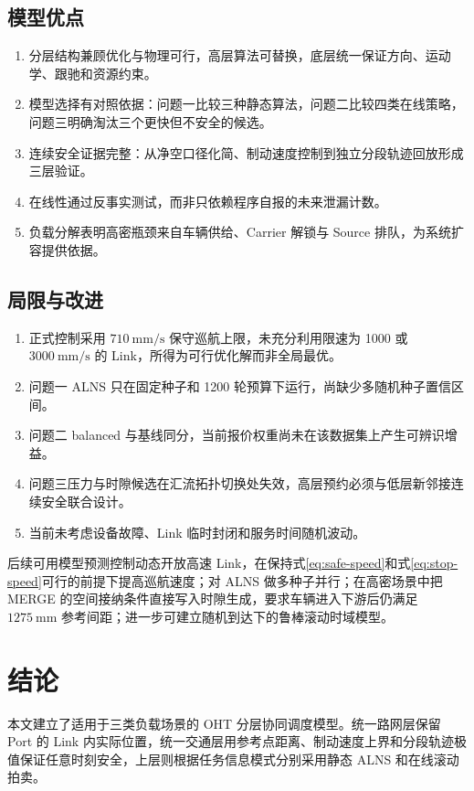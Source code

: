 \documentclass[UTF8]{ctexart}
\begin{document}
\subsection{模型优点}
\begin{enumerate}
\item 分层结构兼顾优化与物理可行，高层算法可替换，底层统一保证方向、运动学、跟驰和资源约束。
\item 模型选择有对照依据：问题一比较三种静态算法，问题二比较四类在线策略，问题三明确淘汰三个更快但不安全的候选。
\item 连续安全证据完整：从净空口径化简、制动速度控制到独立分段轨迹回放形成三层验证。
\item 在线性通过反事实测试，而非只依赖程序自报的未来泄漏计数。
\item 负载分解表明高密瓶颈来自车辆供给、Carrier 解锁与 Source 排队，为系统扩容提供依据。
\end{enumerate}

\subsection{局限与改进}
\begin{enumerate}
\item 正式控制采用 $710\ \mathrm{mm/s}$ 保守巡航上限，未充分利用限速为 1000 或 $3000\ \mathrm{mm/s}$ 的 Link，所得为可行优化解而非全局最优。
\item 问题一 ALNS 只在固定种子和 1200 轮预算下运行，尚缺少多随机种子置信区间。
\item 问题二 balanced 与基线同分，当前报价权重尚未在该数据集上产生可辨识增益。
\item 问题三压力与时隙候选在汇流拓扑切换处失效，高层预约必须与低层新邻接连续安全联合设计。
\item 当前未考虑设备故障、Link 临时封闭和服务时间随机波动。
\end{enumerate}

后续可用模型预测控制动态开放高速 Link，在保持式\eqref{eq:safe-speed}和式\eqref{eq:stop-speed}可行的前提下提高巡航速度；对 ALNS 做多种子并行；在高密场景中把 MERGE 的空间接纳条件直接写入时隙生成，要求车辆进入下游后仍满足 $1275\ \mathrm{mm}$ 参考间距；进一步可建立随机到达下的鲁棒滚动时域模型。

\section{结论}

本文建立了适用于三类负载场景的 OHT 分层协同调度模型。统一路网层保留 Port 的 Link 内实际位置，统一交通层用参考点距离、制动速度上界和分段轨迹极值保证任意时刻安全，上层则根据任务信息模式分别采用静态 ALNS 和在线滚动拍卖。
\end{document}
